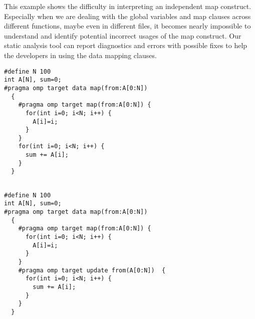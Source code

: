 This example shows the difficulty in interpreting an 
independent map construct. 
Especially when we are dealing with the global variables 
and map clauses across different functions, 
maybe even in different files, 
it becomes nearly impossible to understand 
and identify potential incorrect usages of 
the map construct. 
Our static analysis tool can report diagnostics and errors with possible fixes to help the developers in using the data mapping clauses.

\begin{minipage}{.37\textwidth}
\begin{lstlisting}[style=customc, frame=tlrb,  caption={Reference Count}, label=incorrectegs2]
#define N 100                                                                                            
int A[N], sum=0;
#pragma omp target data map(from:A[0:N]) 
  {
    #pragma omp target map(from:A[0:N]) {
      for(int i=0; i<N; i++) {
        A[i]=i;
      }
    }
    for(int i=0; i<N; i++) {
      sum += A[i];
    }
  }
\end{lstlisting}
\end{minipage}\hfil
\begin{minipage}{.45\textwidth}
\begin{lstlisting}[style=customc, frame=tlrb, caption={Update Clause}, label=incorrectegs-fix2]

#define N 100                                                                                            
int A[N], sum=0;
#pragma omp target data map(from:A[0:N]) 
  {
    #pragma omp target map(from:A[0:N]) {
      for(int i=0; i<N; i++) {    
        A[i]=i;
      }
    }
    #pragma omp target update from(A[0:N])  {
      for(int i=0; i<N; i++) {
        sum += A[i];
      }
    }
  }
\end{lstlisting}
\end{minipage}

